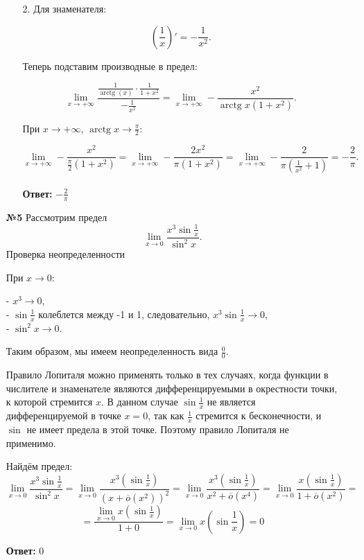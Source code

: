 \documentclass[a4paper]{article}
\renewcommand{\f}[2]{\frac{#1}{#2}}
\newcommand{\lm}[1]{\underset{#1}{\lim}}
\newcommand{\oo}{\overline{o}}
\begin{document}
\begin{enumerate}
\begin{enumerate}
        2. Для знаменателя:

        $$
        \left(\frac{1}{x}\right)' = -\frac{1}{x^2}.
        $$
        
        Теперь подставим производные в предел:

        $$
        \lim_{x \rightarrow +\infty} \frac{\frac{1}{\operatorname{arctg} (x)} \cdot \frac{1}{1+x^2}}{-\frac{1}{x^2}} = \lim_{x \rightarrow +\infty} -\frac{x^2}{\operatorname{arctg} x (1+x^2)}.
        $$
        
        При $x \rightarrow +\infty$, $\operatorname{arctg} x \rightarrow \frac{\pi}{2}$:

        $$
        \lim_{x \rightarrow +\infty} -\frac{x^2}{\frac{\pi}{2} (1+x^2)} = \lim_{x \rightarrow +\infty} -\frac{2x^2}{\pi (1+x^2)}=\lim_{x \rightarrow +\infty} -\frac{2}{\pi (\f{1}{x^2}+1)} = -\frac{2}{\pi}.
        $$
        \\\textbf{Ответ: }$-\f{2}{\pi}$\\
    
    \end{enumerate}

    \item[\textbf{№5}]
    Рассмотрим предел 
    $$
    \lim_{x \rightarrow 0} \frac{x^{3} \sin \frac{1}{x}}{\sin^{2} x}.
    $$
    Проверка неопределенности

    При $x \rightarrow 0$:

    - $x^{3} \rightarrow 0$,\\
    - $\sin \frac{1}{x}$ колеблется между -1 и 1, следовательно, $x^{3} \sin \frac{1}{x} \rightarrow 0$,\\
    - $\sin^{2} x \rightarrow 0$.

    Таким образом, мы имеем неопределенность вида $\frac{0}{0}$.

    Правило Лопиталя можно применять только в тех случаях, когда функции в числителе и знаменателе являются дифференцируемыми в окрестности точки, к которой стремится $x$. В данном случае $\sin \frac{1}{x}$ не является дифференцируемой в точке $x = 0$, так как $\frac{1}{x}$ стремится к бесконечности, и $\sin$ не имеет предела в этой точке. Поэтому правило Лопиталя не применимо.

    Найдём предел:
    $$
    \lim_{x \rightarrow 0} \frac{x^{3} \sin \frac{1}{x}}{\sin^{2} x}=\lim_{x \rightarrow 0} \frac{x^{3} (\sin \frac{1}{x})}{(x + \oo(x^2))^2} = \lim_{x \rightarrow 0} \frac{x^{3} (\sin \frac{1}{x})}{x^2 + \oo(x^4)} = \lim_{x \rightarrow 0} \frac{x (\sin \frac{1}{x})}{1 + \oo(x^2)} =
    $$
    $$
    =\frac{\lm{x \rightarrow 0}x (\sin \frac{1}{x})}{1 + 0} = \lim_{x \rightarrow 0} x (\sin \frac{1}{x}) = 0
    $$

    \textbf{Ответ: } $0$
\end{enumerate}
\end{document}
